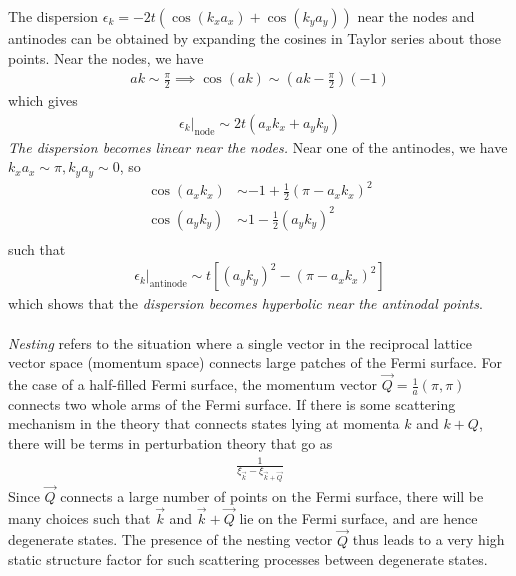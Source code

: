 \documentclass{article}
\begin{document}
The dispersion \(\epsilon_k = -2t\left(\cos(k_x a_x) + \cos(k_y a_y)\right)\) near the nodes and antinodes can be obtained by expanding the cosines in Taylor series about those points. Near the nodes, we have
\begin{equation}\begin{aligned}
	ak \sim \frac{\pi}{2} \implies \cos(ak) \sim \left(ak - \frac{\pi}{2}\right)(-1)
\end{aligned}\end{equation}
which gives
\begin{equation}\begin{aligned}
	\epsilon_k \vert_\text{node} \sim 2t \left(a_x k_x + a_y k_y\right)
\end{aligned}\end{equation}
\textit{The dispersion becomes linear near the nodes.} Near one of the antinodes, we have \(k_x a_x \sim \pi, k_y a_y \sim 0\), so
\begin{equation}\begin{aligned}
	\cos (a_x k_x) &\sim -1 + \frac{1}{2}\left( \pi - a_x k_x \right)^2\\
	\cos (a_y k_y) &\sim 1 - \frac{1}{2}\left(a_y k_y \right)^2\\
\end{aligned}\end{equation}
such that
\begin{equation}\begin{aligned}
	\epsilon_k \vert_\text{antinode} \sim t \left[\left(a_y k_y \right)^2 - \left( \pi - a_x k_x \right)^2\right]
\end{aligned}\end{equation}
which shows that the \textit{dispersion becomes hyperbolic near the antinodal points}.
\\\\
\textit{Nesting} refers to the situation where a single vector in the reciprocal lattice vector space (momentum space) connects large patches of the Fermi surface. For the case of a half-filled Fermi surface, the momentum vector \(\vec Q = \frac{1}{a}\left( \pi, \pi\right)\) connects two whole arms of the Fermi surface. If there is some scattering mechanism in the theory that connects states lying at momenta \(k\) and \(k+Q\), there will be terms in perturbation theory that go as
\begin{equation}\begin{aligned}
	\frac{1}{\xi_{\vec k} - \xi_{\vec k + \vec Q}}
\end{aligned}\end{equation}
Since \(\vec Q\) connects a large number of points on the Fermi surface, there will be many choices such that \(\vec k\) and \(\vec k + \vec Q\) lie on the Fermi surface, and are hence degenerate states. The presence of the nesting vector \(\vec Q\) thus leads to a very high static structure factor for such scattering processes between degenerate states.
\end{document}
